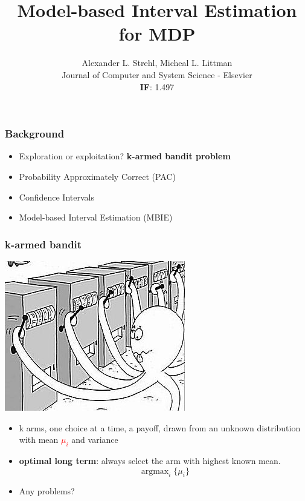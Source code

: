 \documentclass{beamer}
\title{Model-based Interval Estimation for MDP}
\author{Alexander L. Strehl, Micheal L. Littman \\
Journal of Computer and System Science - Elsevier\\
\textbf{IF}: 1.497}
\date{}
\newcommand{\tc}[2]{\textcolor{#1}{#2}}
\newcommand{\tcr}[1]{\tc{red}{#1}}
\DeclareMathOperator{\argmax}{argmax}
\begin{document}
\begin{frame}
	\maketitle

\end{frame}
\begin{frame}
	\frametitle{Background}
	\begin{itemize}
		\item Exploration or exploitation? \textbf{k-armed bandit problem}
		\item Probability Approximately Correct (PAC)
		\item Confidence Intervals
		\item Model-based Interval Estimation (MBIE)
	\end{itemize}

\end{frame}

\begin{frame}
	\frametitle{k-armed bandit}
	\begin{center}\includegraphics[width=.4\linewidth]{multiarmedbandit.jpg}\end{center}	
	\begin{itemize}
		\item k arms, one choice at a time, a payoff, drawn from an unknown distribution with mean \tcr{$\mu_i$} and variance
		\item \textbf{optimal long term}: always select the arm with highest known mean.
		$$ \argmax_i \{\mu_i\}$$
		\item Any problems?
	\end{itemize}

\end{frame}
\end{document}
